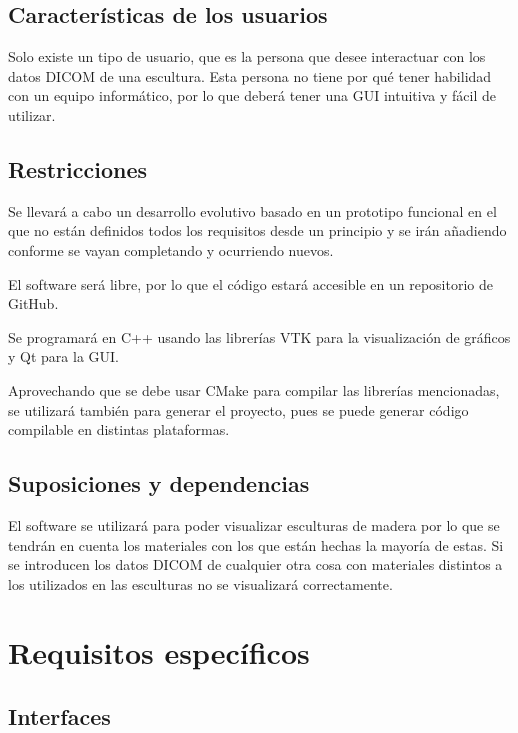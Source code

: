 	\subsection{Características de los usuarios}
	
	Solo existe un tipo de usuario, que es la persona que desee interactuar con los datos DICOM de una escultura. Esta persona no tiene por qué tener habilidad con un equipo informático, por lo que \myTitle deberá tener una GUI intuitiva y fácil de utilizar.
	
	\subsection{Restricciones}
	
	Se llevará a cabo un desarrollo evolutivo basado en un prototipo funcional en el que no están definidos todos los requisitos desde un principio y se irán añadiendo conforme se vayan completando y ocurriendo nuevos.
	
	El software será libre, por lo que el código estará accesible en un repositorio de GitHub.
	
	Se programará en C++ usando las librerías VTK para la visualización de gráficos y Qt para la GUI.
	
	Aprovechando que se debe usar CMake para compilar las librerías mencionadas, se utilizará también para generar el proyecto, pues se puede generar código compilable en distintas plataformas.
	
	\subsection{Suposiciones y dependencias}
	
	El software se utilizará para poder visualizar esculturas de madera por lo que se tendrán en cuenta los materiales con los que están hechas la mayoría de estas. Si se introducen los datos DICOM de cualquier otra cosa con materiales distintos a los utilizados en las esculturas no se visualizará correctamente.

\section{Requisitos específicos}

	\subsection{Interfaces}
	
